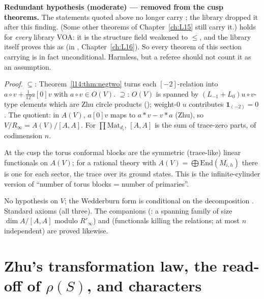 \begin{warning}
\textbf{Redundant hypothesis (moderate) --- removed from the cusp theorems.} The statements quoted above no longer carry
; the library dropped it after this finding. (Some other theorems of Chapter~\ref{ch:L15} still carry it.)
 holds for \emph{every} library VOA: it is the structure field
 weakened to $\le$, and the library itself proves this as
 (in , Chapter~\ref{ch:L16}). So every theorem of this
section carrying  is in fact unconditional. Harmless, but a referee should not count it as an assumption.
\end{warning}
\noindent\emph{Proof.} $\subseteq$: Theorem~\ref{l14:thm:negtwo} turns each $[-2]$-relation into $a\circ v + \frac1{12}a[0]v$ with
$a\circ v\in O(V)$. $\supseteq$: $O(V)$ is spanned by $(L_{-1}+L_0)u\circ v$-type elements which are Zhu circle products
(); weight-$0$ $u$ contributes $\mathbf 1_{(-2)} = 0$. The quotient: in $A(V)$, $a[0]v$ maps to
$a*v - v*a$ (Zhu), so $V/R_\infty = A(V)/[A,A]$. For $\prod\mathrm{Mat}_{d_i}$, $[A,A]$ is the sum of trace-zero parts, of
codimension $n$.
\begin{physics}
At the cusp the torus conformal blocks are the symmetric (trace-like) linear functionals on $A(V)$; for a rational theory with
$A(V) = \bigoplus\mathrm{End}(M_{i,h})$ there is one for each sector, the trace over its ground states. This is the
infinite-cylinder version of ``number of torus blocks = number of primaries''.
\end{physics}
\begin{status}
No hypothesis on $V$; the Wedderburn form is conditional on the
decomposition . Standard axioms (all three). The companions 
(: a spanning family of size $\dim A/[A,A]$ modulo $R'_\infty$) and
 (functionals killing the relations; at most $n$ independent) are proved likewise.
\end{status}

\section{Zhu's transformation law, the read-off of \texorpdfstring{$\rho(S)$}{rho(S)}, and characters}\label{l14:sec:rhoS}

